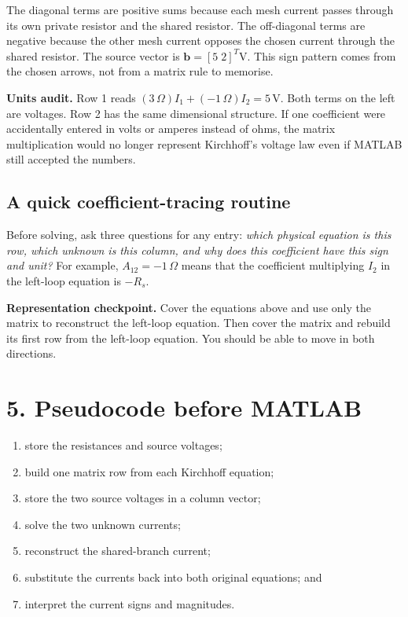 \documentclass[11pt,a4paper]{article}
\begin{document}
The diagonal terms are positive sums because each mesh current passes through its own private resistor and the shared resistor. The off-diagonal terms are negative because the other mesh current opposes the chosen current through the shared resistor. The source vector is $\mathbf b=[5\;2]^T\mathrm V$. This sign pattern comes from the chosen arrows, not from a matrix rule to memorise.

\begin{checkbox}\textbf{Units audit.} Row 1 reads $(3\,\Omega)I_1+(-1\,\Omega)I_2=5\,\mathrm V$. Both terms on the left are voltages. Row 2 has the same dimensional structure. If one coefficient were accidentally entered in volts or amperes instead of ohms, the matrix multiplication would no longer represent Kirchhoff's voltage law even if MATLAB still accepted the numbers.\end{checkbox}

\subsection*{A quick coefficient-tracing routine}
Before solving, ask three questions for any entry: \emph{which physical equation is this row, which unknown is this column, and why does this coefficient have this sign and unit?} For example, $A_{12}=-1\,\Omega$ means that the coefficient multiplying $I_2$ in the left-loop equation is $-R_s$.

\begin{keybox}\textbf{Representation checkpoint.} Cover the equations above and use only the matrix to reconstruct the left-loop equation. Then cover the matrix and rebuild its first row from the left-loop equation. You should be able to move in both directions.\end{keybox}

\section*{5. Pseudocode before MATLAB}
\begin{enumerate}[nosep,leftmargin=7mm]
\item store the resistances and source voltages;
\item build one matrix row from each Kirchhoff equation;
\item store the two source voltages in a column vector;
\item solve the two unknown currents;
\item reconstruct the shared-branch current;
\item substitute the currents back into both original equations; and
\item interpret the current signs and magnitudes.
\end{enumerate}
\end{document}
